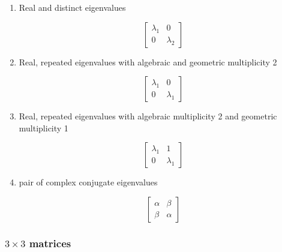 \documentclass[12pt]{article}
\theoremstyle{definition}
\begin{document}
\begin{enumerate}
\item Real and distinct eigenvalues

\[
\begin{bmatrix}
\lambda_1 & 0 \\
0 & \lambda_2
\end{bmatrix}
\]

\item Real, repeated eigenvalues with algebraic and geometric multiplicity 2

\[
\begin{bmatrix}
\lambda_1 & 0 \\
0 & \lambda_1
\end{bmatrix}
\]

\item Real, repeated eigenvalues with algebraic multiplicity 2 and geometric multiplicity 1


\[
\begin{bmatrix}
\lambda_1 & 1 \\
0 & \lambda_1
\end{bmatrix}
\]

\item pair of complex conjugate eigenvalues

\[
\begin{bmatrix}
\alpha & \beta \\
\beta & \alpha
\end{bmatrix}
\]

\end{enumerate}

\subsubsection{$3 \times 3$ matrices}
\end{document}

